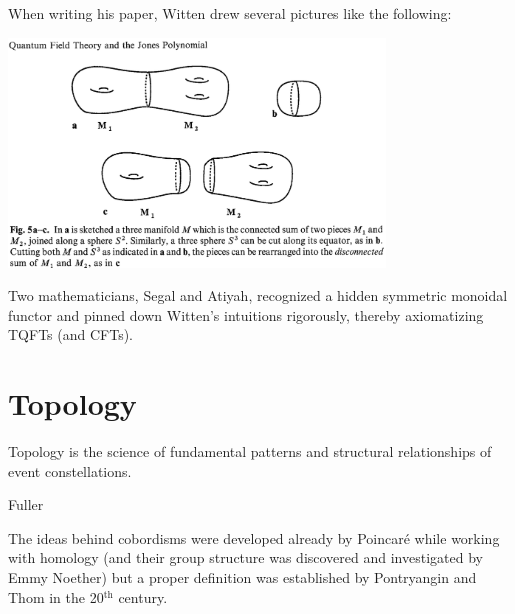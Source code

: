 When writing his paper, Witten drew several pictures like the following:
\begin{center}
\includegraphics[width=10cm]{images/Lecture 1/witten.png}
\end{center}
Two mathematicians, Segal and Atiyah, recognized a hidden symmetric monoidal functor and pinned down  Witten's intuitions rigorously, thereby axiomatizing TQFTs (and CFTs).

\section{Topology}
\begin{flushleft}
\epigraph{Topology is the science of fundamental patterns and structural relationships of event constellations.}{Fuller}
\end{flushleft}
The ideas behind cobordisms were developed already by Poincaré while working with homology (and their group structure was discovered and investigated by Emmy Noether) but a proper definition was established by Pontryangin and Thom in the 20$^{\text{th}}$ century.

